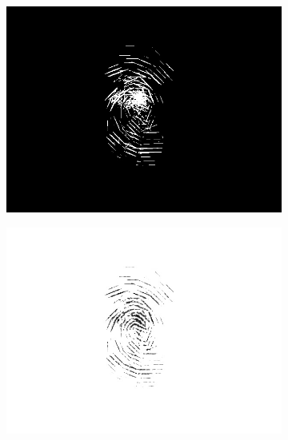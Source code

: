 \documentclass{beamer}
\begin{document}
{\begin{figure}[!ht]
\begin{subfigure}[ht]{0.15\textwidth}
            \includegraphics[width=\textwidth]{fingerprints/2004Db1a/1_2_mask.jpg}
        \end{subfigure}
        \qquad
        \begin{subfigure}[ht]{0.15\textwidth}
            \includegraphics[width=\textwidth]{fingerprints/2004Db1a/1_2_filtered.jpg}
        \end{subfigure}
    \end{figure}
    \begin{figure}[!ht]
        \centering
        \begin{subfigure}[ht]{0.15\textwidth}

\end{subfigure}
\end{figure}}
\end{document}
